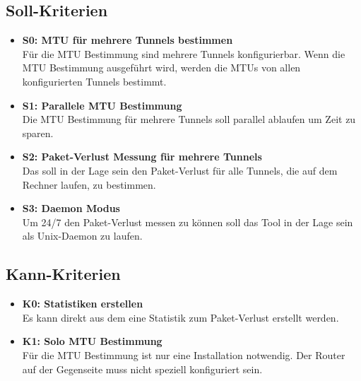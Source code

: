 \subsection{Soll-Kriterien}
\begin{itemize}

\item \textbf{S0: MTU für mehrere Tunnels bestimmen} \\
Für die \ac{MTU} Bestimmung sind mehrere Tunnels konfigurierbar. Wenn die \ac{MTU} Bestimmung ausgeführt wird, werden die \ac{MTU}s von allen konfigurierten Tunnels bestimmt.

\item \textbf{S1: Parallele MTU Bestimmung} \\
Die \ac{MTU} Bestimmung für mehrere Tunnels soll parallel ablaufen um Zeit zu sparen.

\item \textbf{S2: Paket-Verlust Messung für mehrere Tunnels} \\
Das \tool{} soll in der Lage sein den Paket-Verlust für alle Tunnels, die auf dem Rechner laufen, zu bestimmen.
  	
\item \textbf{S3: Daemon Modus} \\
Um 24/7 den Paket-Verlust messen zu können soll das Tool in der Lage sein als Unix-Daemon zu laufen.

\end{itemize}

\subsection{Kann-Kriterien}
\begin{itemize}

\item \textbf{K0: Statistiken erstellen} \\
Es kann direkt aus dem \tool{} eine Statistik zum Paket-Verlust erstellt werden.

\item \textbf{K1: Solo \ac{MTU} Bestimmung} \\
Für die \ac{MTU} Bestimmung ist nur eine \tool{} Installation notwendig. Der Router auf der Gegenseite muss nicht speziell konfiguriert sein.

\end{itemize}